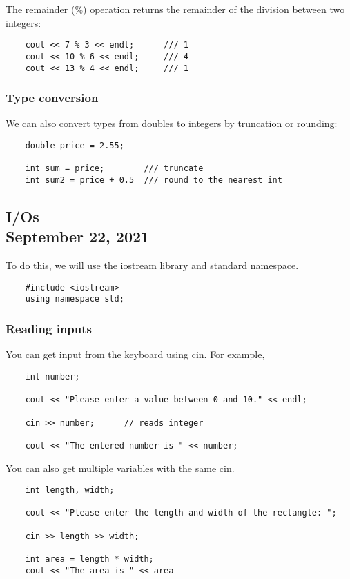 \documentclass[]{article}
\begin{document}
The remainder (\%) operation returns the remainder of the division between two integers:

\begin{lstlisting}
	cout << 7 % 3 << endl;		/// 1
	cout << 10 % 6 << endl;		/// 4
	cout << 13 % 4 << endl;		/// 1
\end{lstlisting}

\subsubsection{Type conversion}

We can also convert types from doubles to integers by truncation or rounding: 

\begin{lstlisting}
	double price = 2.55;
	
	int sum = price;		/// truncate
	int sum2 = price + 0.5 	/// round to the nearest int
\end{lstlisting}
\bigbreak


\subsection{I/Os\\ {\large \normalfont September 22, 2021}}
\bigbreak


To do this, we will use the iostream library and standard namespace.

\begin{lstlisting}
	#include <iostream>
	using namespace std;
\end{lstlisting}
\bigbreak

\subsubsection{Reading inputs}

You can get input from the keyboard using cin. For example,

\begin{lstlisting}
	int number;
	
	cout << "Please enter a value between 0 and 10." << endl;
	
	cin >> number;		// reads integer
	
	cout << "The entered number is " << number;
\end{lstlisting}
\bigbreak

You can also get multiple variables with the same cin.

\begin{lstlisting}
	int length, width;
	
	cout << "Please enter the length and width of the rectangle: ";
	
	cin >> length >> width;
	
	int area = length * width;
	cout << "The area is " << area
\end{lstlisting}
\bigbreak
\end{document}
